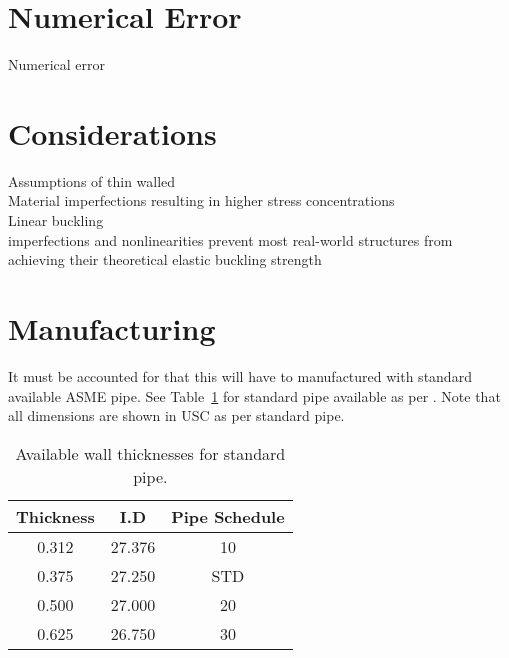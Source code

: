 
\section{Numerical Error}
Numerical error\\


\section{Considerations}
Assumptions of thin walled\\

Material imperfections resulting in higher stress concentrations\\

Linear buckling\\
imperfections and nonlinearities prevent most real-world structures from achieving their theoretical elastic buckling strength\\


\section{Manufacturing}

It must be accounted for that this will have to manufactured with standard available ASME pipe. See Table~\ref{table:5_pipe} for standard pipe available as per \cite{PIPEINFO}. Note that all dimensions are shown in USC as per standard pipe.

\begin{table}[ht]
	\caption{Available wall thicknesses for standard pipe.}
	\centering
	\begin{tabular}{ccc}
    \textbf{Thickness} & \textbf{I.D} & \textbf{Pipe Schedule} \\
    \midrule
    0.312 & 27.376 & 10 \\
    0.375 & 27.250 & STD \\
    0.500 & 27.000 & 20 \\
    0.625 & 26.750 & 30 \\
    \end{tabular}%
	\label{table:5_pipe}
\end{table}